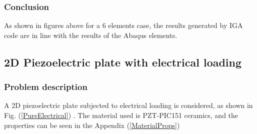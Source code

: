 \documentclass[11pt]{article}
\begin{document}
\subsubsection{Conclusion}
As shown in figures above for a 6 elements case, the results generated by IGA code are in line with the results of the Abaqus elements.  





\subsection{2D Piezoelectric plate with electrical loading}
\subsubsection{Problem description} \label{2DPPWEL}
A 2D piezoelectric plate subjected to electrical loading is considered, as shown in Fig. (\ref{PureElectrical}) . The material used is PZT-PIC151 ceramics, and the properties can be seen in the Appendix (\ref{MaterialProps})
\end{document}

